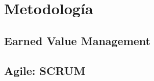 
\section{Metodología}
  \subsection{Earned Value Management}
  \subsection{Agile: SCRUM}
\clearpage
